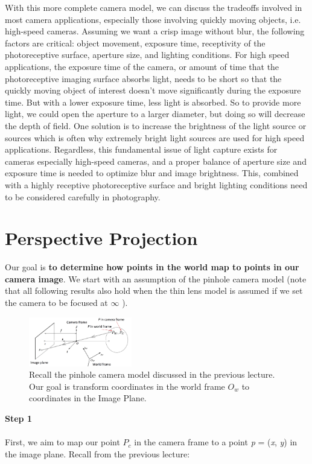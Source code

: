 \documentclass[]{article}
\begin{document}
With this more complete camera model, we can discuss the tradeoffs involved in most camera applications, especially those involving quickly moving objects, i.e. high-speed cameras. Assuming we want a crisp image without blur, the following factors are critical: object movement, exposure time, receptivity of the photoreceptive surface, aperture size, and lighting conditions. For high speed applications, the exposure time of the camera, or amount of time that the photoreceptive imaging surface absorbs light, needs to be short so that the quickly moving object of interest doesn't move significantly during the exposure time. But with a lower exposure time, less light is absorbed. So to provide more light, we could open the aperture to a larger diameter, but doing so will decrease the depth of field. One solution is to increase the brightness of the light source or sources which is often why extremely bright light sources are used for high speed applications. Regardless, this fundamental issue of light capture exists for cameras especially high-speed cameras, and a proper balance of aperture size and exposure time is needed to optimize blur and image brightness. This, combined with a highly receptive photoreceptive surface and bright lighting conditions need to be considered carefully in photography.


\section{Perspective Projection}
Our goal is \textbf{to determine how points in the world map to points in our camera image}. We start with an assumption of the pinhole camera model (note that all following results also hold when the thin lens model is assumed if we set the camera to be focused at $\infty$ ).

\begin{figure}[H]
\includegraphics[width=0.4\textwidth]{diagram_1_vik.png}
\centering
\caption{Recall the pinhole camera model discussed in the previous lecture. Our goal is transform coordinates in the world frame $O_w$ to coordinates in the Image Plane. }
\label{fig:pinhole_cam}
\end{figure}

\textbf{Step 1}\\\\
First, we aim to map our point $P_c$ in the camera frame to a point \textit{p} = (\textit{x}, \textit{y}) in the image plane. Recall from the previous lecture:
\end{document}
